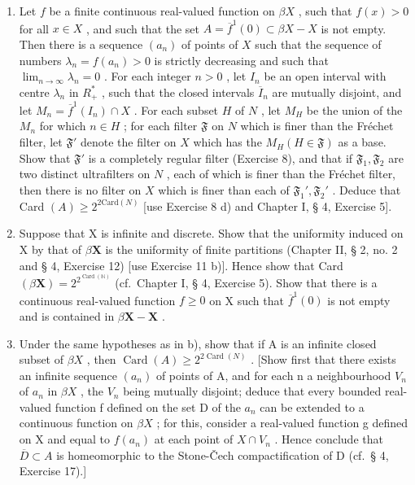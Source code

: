 \begin{enumerate}
\def\labelenumi{\alph{enumi})}
\item
  Let \(f\) be a finite continuous real-valued function on \(\beta X\) , such that \(f(x) > 0\) for all \(x \in X\) , and such that the set \(A = \overline{f}^1(0) \subset \beta X - X\) is not empty. Then there is a sequence \((a_n)\) of points of \(X\) such that the sequence of numbers \(\lambda_n = f(a_n) > 0\) is strictly decreasing and such that \(\lim_{n \to \infty} \lambda_n = 0\) . For each integer \(n > 0\) , let \(I_n\) be an open interval with centre \(\lambda_n\) in \(R_+^*\) , such that the closed intervals \(\overline{I}_n\) are mutually disjoint, and let \(M_n = \overline{f}^1(I_n) \cap X\) . For each subset \(H\) of \(N\) , let \(M_H\) be the union of the \(M_n\) for which \(n \in H\) ; for each filter \(\mathfrak{F}\) on \(N\) which is finer than the Fréchet filter, let \(\mathfrak{F}'\) denote the filter on \(X\) which has the \(M_H(H \in \mathfrak{F})\) as a base. Show that \(\mathfrak{F}'\) is a completely regular filter (Exercise 8), and that if \(\mathfrak{F}_1, \mathfrak{F}_2\) are two distinct ultrafilters on \(N\) , each of which is finer than the Fréchet filter, then there is no filter on \(X\) which is finer than each of \(\mathfrak{F}_1', \mathfrak{F}_2'\) . Deduce that Card \((A) \geqslant 2^{2\text{Card}(N)}\) {[}use Exercise 8 d) and Chapter I, § 4, Exercise 5{]}.
\item
  Suppose that X is infinite and discrete. Show that the uniformity induced on X by that of \(\beta\mathbf{X}\) is the uniformity of finite partitions (Chapter II, § 2, no. 2 and § 4, Exercise 12) {[}use Exercise 11 b){]}. Hence show that Card \((\beta\mathbf{X}) = 2^{2^{\operatorname{Card}(\mathbb{N})}}\) (cf.~Chapter I, § 4, Exercise 5). Show that there is a continuous real-valued function \(f \geqslant 0\) on X such that \(\overline{f}^{1}(0)\) is not empty and is contained in \(\beta\mathbf{X} - \mathbf{X}\) .
\item
  Under the same hypotheses as in b), show that if A is an infinite closed subset of \(\beta X\) , then \(\operatorname{Card}(A) \geqslant 2^{2\operatorname{Card}(N)}\) . {[}Show first that there exists an infinite sequence \((a_{n})\) of points of A, and for each n a neighbourhood \(V_{n}\) of \(a_{n}\) in \(\beta X\) , the \(V_{n}\) being mutually disjoint; deduce that every bounded real-valued function f defined on the set D of the \(a_{n}\) can be extended to a continuous function on \(\beta X\) ; for this, consider a real-valued function g defined on X and equal to \(f(a_{n})\) at each point of \(X \cap V_{n}\) . Hence conclude that \(\overline{D} \subset A\) is homeomorphic to the Stone-Čech compactification of D (cf.~§ 4, Exercise 17).{]}
\end{enumerate}

